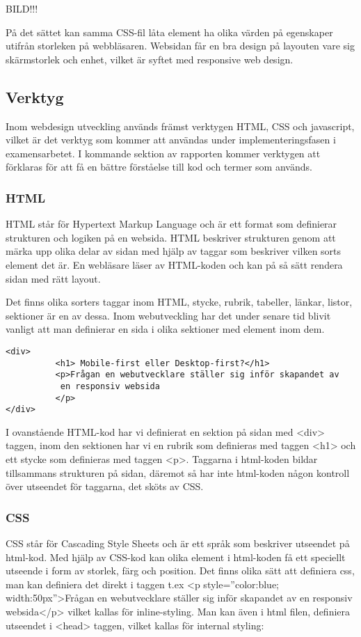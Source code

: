 \documentclass[11pt]{article}
\begin{document}
BILD!!! 

På det sättet kan samma CSS-fil låta element ha olika värden på egenskaper utifrån storleken på webbläsaren. Websidan får en bra design på layouten vare sig skärmstorlek och enhet, vilket är syftet med 
responsive web design.
\newpage

\subsection{Verktyg}

Inom webdesign utveckling används främst verktygen HTML, CSS och javascript, vilket är det verktyg som kommer att användas under implementeringsfasen i examensarbetet.  I kommande sektion av rapporten kommer verktygen att förklaras för att få en bättre förståelse till kod och termer som används.

\subsubsection{HTML}
HTML står för Hypertext Markup Language och är ett format som definierar strukturen och logiken på en websida. HTML beskriver strukturen genom att märka upp olika delar av sidan med hjälp av taggar som beskriver vilken sorts element det är. En webläsare läser av HTML-koden och kan på så sätt rendera sidan med rätt layout.

Det finns olika sorters taggar inom HTML, stycke, rubrik, tabeller, länkar, listor, sektioner är en av dessa. Inom webutveckling har det under senare tid blivit vanligt att man definierar en sida i olika sektioner med element inom dem. 

\vspace{1cm}
\begin{verbatim}
<div> 
          <h1> Mobile-first eller Desktop-first?</h1>
          <p>Frågan en webutvecklare ställer sig inför skapandet av
           en responsiv websida
          </p>
</div>
\end{verbatim}
\vspace{1cm}

I ovanstående HTML-kod har vi definierat en sektion på sidan med <div> taggen, inom den sektionen har vi en rubrik som definieras med taggen <h1> och ett stycke som definieras med taggen <p>. Taggarna i html-koden bildar tillsammans strukturen på sidan, däremot så har inte html-koden någon kontroll över utseendet för taggarna, det sköts av CSS.  

\subsubsection{CSS}
CSS står för Cascading Style Sheets och är ett språk som beskriver utseendet på html-kod.
Med hjälp av CSS-kod kan olika element i html-koden få ett speciellt utseende i form av storlek, färg och position. Det finns olika sätt att definiera css, man kan definiera det direkt i taggen t.ex <p style=”color:blue; width:50px”>Frågan en webutvecklare ställer sig inför skapandet av en responsiv websida</p> vilket kallas för inline-styling. Man kan även i html filen, definiera utseendet i <head> taggen, vilket kallas för internal styling:
\end{document}

